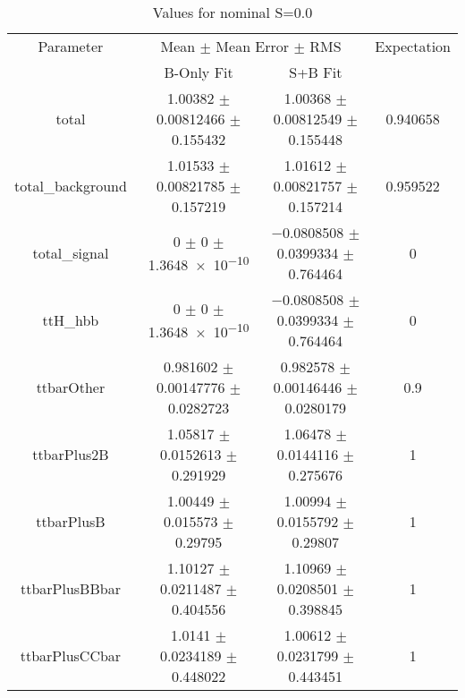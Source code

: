 \begin{table}
\centering
\caption{Values for nominal S=0.0}
\begin{tabular}{cccc}
\toprule
Parameter & \multicolumn{2}{c}{Mean $\pm$ Mean Error $\pm$ RMS} & Expectation\\
 & B-Only Fit & S+B Fit & \\
\midrule
total & \num{1.00382} $\pm$ \num{0.00812466} $\pm$ \num{0.155432} & \num{1.00368} $\pm$ \num{0.00812549} $\pm$ \num{0.155448} & \num{0.940658}\\
total\_background & \num{1.01533} $\pm$ \num{0.00821785} $\pm$ \num{0.157219} & \num{1.01612} $\pm$ \num{0.00821757} $\pm$ \num{0.157214} & \num{0.959522}\\
total\_signal & \num{0} $\pm$ \num{0} $\pm$ \num{1.3648e-10} & \num{-0.0808508} $\pm$ \num{0.0399334} $\pm$ \num{0.764464} & \num{0}\\
ttH\_hbb & \num{0} $\pm$ \num{0} $\pm$ \num{1.3648e-10} & \num{-0.0808508} $\pm$ \num{0.0399334} $\pm$ \num{0.764464} & \num{0}\\
ttbarOther & \num{0.981602} $\pm$ \num{0.00147776} $\pm$ \num{0.0282723} & \num{0.982578} $\pm$ \num{0.00146446} $\pm$ \num{0.0280179} & \num{0.9}\\
ttbarPlus2B & \num{1.05817} $\pm$ \num{0.0152613} $\pm$ \num{0.291929} & \num{1.06478} $\pm$ \num{0.0144116} $\pm$ \num{0.275676} & \num{1}\\
ttbarPlusB & \num{1.00449} $\pm$ \num{0.015573} $\pm$ \num{0.29795} & \num{1.00994} $\pm$ \num{0.0155792} $\pm$ \num{0.29807} & \num{1}\\
ttbarPlusBBbar & \num{1.10127} $\pm$ \num{0.0211487} $\pm$ \num{0.404556} & \num{1.10969} $\pm$ \num{0.0208501} $\pm$ \num{0.398845} & \num{1}\\
ttbarPlusCCbar & \num{1.0141} $\pm$ \num{0.0234189} $\pm$ \num{0.448022} & \num{1.00612} $\pm$ \num{0.0231799} $\pm$ \num{0.443451} & \num{1}\\
\bottomrule
\end{tabular}
\end{table}